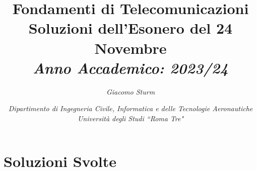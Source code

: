 \documentclass{article}
\begin{document}
\title{%
    \textbf{Fondamenti di Telecomunicazioni}  \\ 
    \large Soluzioni dell'Esonero del 24 Novembre\\
    \textit{Anno Accademico: 2023/24}}
\author{\textit{Giacomo Sturm}}
\date{\textit{Dipartimento di Ingegneria Civile, Informatica e delle Tecnologie Aeronautiche \\
Università degli Studi ``Roma Tre"}}

\maketitle
\thispagestyle{link}


\clearpage

\pagestyle{fancy}
\fancyhead{}\fancyfoot{}
\fancyfoot[C]{\thepage}

\tableofcontents
\clearpage


\section{Soluzioni Svolte}
\end{document}
